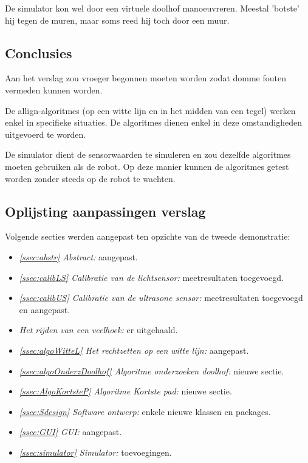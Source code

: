 \documentclass[tt3]{penoverslag}
\begin{document}
De simulator kon wel door een virtuele doolhof manoeuvreren. Meestal 'botste' hij tegen de muren, maar soms reed hij toch door een muur.


\subsection{Conclusies} %
\label{Assec:conc2}
Aan het verslag zou vroeger begonnen moeten worden zodat domme fouten vermeden kunnen worden.

De allign-algoritmes (op een witte lijn en in het midden van een tegel) werken enkel in specifieke situaties. De algoritmes dienen enkel in deze omstandigheden uitgevoerd te worden.

De simulator dient de sensorwaarden te simuleren en zou dezelfde algoritmes moeten gebruiken als de robot. Op deze manier kunnen de algoritmes getest worden zonder steeds op de robot te wachten.


\subsection{Oplijsting aanpassingen verslag} %
\label{Assec:aanp2}
Volgende secties werden aangepast ten opzichte van de tweede demonstratie:

\begin{itemize}

\item \textit{\ref{ssec:abstr} Abstract:} aangepast.
\item \textit{\ref{ssec:calibLS} Calibratie van de lichtsensor:} meetresultaten toegevoegd.
\item \textit{\ref{ssec:calibUS} Calibratie van de ultrasone sensor:} meetresultaten toegevoegd en aangepast.
\item \textit{ Het rijden van een veelhoek:} er uitgehaald.
\item \textit{\ref{ssec:algoWitteL} Het rechtzetten op een witte lijn:} aangepast.
\item \textit{\ref{ssec:algoOnderzDoolhof} Algoritme onderzoeken doolhof:} nieuwe sectie.
\item \textit{\ref{ssec:AlgoKortsteP} Algoritme Kortste pad:} nieuwe sectie.
\item \textit{\ref{ssec:Sdesign} Software ontwerp:} enkele nieuwe klassen en packages.
\item \textit{\ref{ssec:GUI} GUI:} aangepast.
\item \textit{\ref{ssec:simulator} Simulator:} toevoegingen.
\end{itemize}
\end{document}
